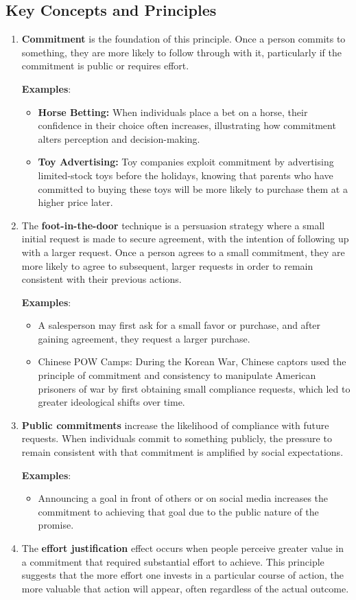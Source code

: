 \subsection*{Key Concepts and Principles}
\begin{enumerate}
    \item \textbf{Commitment} is the foundation of this principle. Once a person commits to something, they are more likely to follow through with it, particularly if the commitment is public or requires effort.
    
    \textbf{Examples}:
    \begin{itemize}
        \item \textbf{Horse Betting:} When individuals place a bet on a horse, their confidence in their choice often increases, illustrating how commitment alters perception and decision-making.
        \item \textbf{Toy Advertising:} Toy companies exploit commitment by advertising limited-stock toys before the holidays, knowing that parents who have committed to buying these toys will be more likely to purchase them at a higher price later.
    \end{itemize}
    \item The \textbf{foot-in-the-door} technique is a persuasion strategy where a small initial request is made to secure agreement, with the intention of following up with a larger request. Once a person agrees to a small commitment, they are more likely to agree to subsequent, larger requests in order to remain consistent with their previous actions.

    \textbf{Examples}:
    \begin{itemize}
        \item A salesperson may first ask for a small favor or purchase, and after gaining agreement, they request a larger purchase.
        \item Chinese POW Camps: During the Korean War, Chinese captors used the principle of commitment and consistency to manipulate American prisoners of war by first obtaining small compliance requests, which led to greater ideological shifts over time.
    \end{itemize}
    \item \textbf{Public commitments} increase the likelihood of compliance with future requests. When individuals commit to something publicly, the pressure to remain consistent with that commitment is amplified by social expectations.

    \textbf{Examples}:
    \begin{itemize}
        \item Announcing a goal in front of others or on social media increases the commitment to achieving that goal due to the public nature of the promise.
    \end{itemize}
    \item The \textbf{effort justification} effect occurs when people perceive greater value in a commitment that required substantial effort to achieve. This principle suggests that the more effort one invests in a particular course of action, the more valuable that action will appear, often regardless of the actual outcome.


\end{enumerate}
